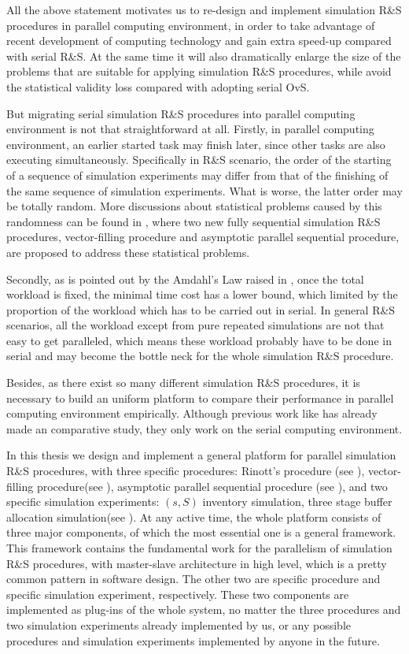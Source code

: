 \documentclass[12pt,a4paper]{report}
\begin{document}
All the above statement motivates us to re-design and implement simulation R\&S procedures in parallel computing environment, in order to take advantage of recent development of computing technology and gain extra speed-up compared with serial R\&S. At the same time it will also dramatically enlarge the size of the problems that are suitable for applying simulation R\&S procedures, while avoid the statistical validity loss compared with adopting serial OvS.

But migrating serial simulation R\&S procedures into parallel computing environment is not that straightforward at all. Firstly, in parallel computing environment, an earlier started task may finish later, since other tasks are also executing simultaneously. Specifically in R\&S scenario, the order of the starting of a sequence of simulation experiments may differ from that of the finishing of the same sequence of simulation experiments. What is worse, the latter order may be totally random. More discussions about statistical problems caused by this randomness can be found in \cite{ras-seq-parallel}, where two new fully sequential simulation R\&S procedures, vector-filling procedure and asymptotic parallel sequential procedure, are proposed to address these statistical problems.

Secondly, as is pointed out by the Amdahl's Law raised in \cite{amdahl}, once the total workload is fixed, the minimal time cost has a lower bound, which limited by the proportion of the workload which has to be carried out in serial. In general R\&S scenarios, all the workload except from pure repeated simulations are not that easy to get paralleled, which means these workload probably have to be done in serial and may become the bottle neck for the whole simulation R\&S procedure.

Besides, as there exist so many different simulation R\&S procedures, it is necessary to build an uniform platform to compare their performance in parallel computing environment empirically. Although previous work like \cite{ms05ras} has already made an comparative study, they only work on the serial computing environment.

In this thesis we design and implement a general platform for parallel simulation R\&S procedures, with three specific procedures: Rinott's procedure (see \cite{cistam1978rinott}), vector-filling procedure(see \cite{ras-seq-parallel}), asymptotic parallel sequential procedure (see \cite{ras-seq-parallel}), and two specific simulation experiments: $(s, S)$ inventory simulation, three stage buffer allocation simulation(see \cite{smoms93threestage}). At any active time, the whole platform consists of three major components, of which the most essential one is a general framework. This framework contains the fundamental work for the parallelism of simulation R\&S procedures, with master-slave architecture in high level, which is a pretty common pattern in software design. The other two are specific procedure and specific simulation experiment, respectively. These two components are implemented as plug-ins of the whole system, no matter the three procedures and two simulation experiments already implemented by us, or any possible procedures and simulation experiments implemented by anyone in the future.
\end{document}
